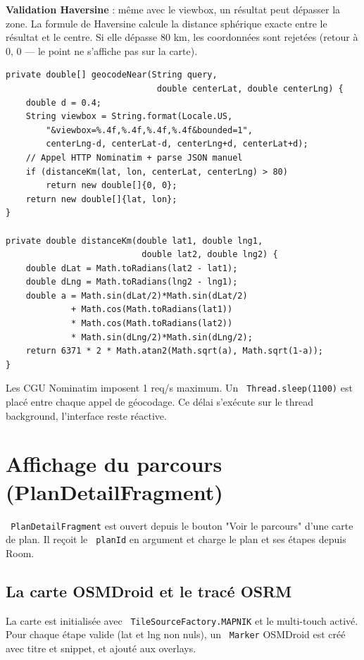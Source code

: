 \documentclass[a4paper,12pt,openany]{report}
\newenvironment{warnbox}[1][Attention]{%
  \begin{tcolorbox}[mybox, colback=warnbg, colframe=Goldenrod!60,
    title=\textcolor{brown!80}{#1}]\small\color{brown!70!black}}
  {\end{tcolorbox}}
\newcommand{\ic}[1]{\texttt{\small\colorbox{lightbg}{\color{navy!90} #1}}}
\begin{document}
\textbf{Validation Haversine} : même avec le viewbox, un résultat peut
dépasser la zone. La formule de Haversine calcule la distance sphérique exacte
entre le résultat et le centre. Si elle dépasse 80 km, les coordonnées sont
rejetées (retour à 0, 0 — le point ne s'affiche pas sur la carte).

\begin{lstlisting}
private double[] geocodeNear(String query,
                              double centerLat, double centerLng) {
    double d = 0.4;
    String viewbox = String.format(Locale.US,
        "&viewbox=%.4f,%.4f,%.4f,%.4f&bounded=1",
        centerLng-d, centerLat-d, centerLng+d, centerLat+d);
    // Appel HTTP Nominatim + parse JSON manuel
    if (distanceKm(lat, lon, centerLat, centerLng) > 80)
        return new double[]{0, 0};
    return new double[]{lat, lon};
}

private double distanceKm(double lat1, double lng1,
                           double lat2, double lng2) {
    double dLat = Math.toRadians(lat2 - lat1);
    double dLng = Math.toRadians(lng2 - lng1);
    double a = Math.sin(dLat/2)*Math.sin(dLat/2)
             + Math.cos(Math.toRadians(lat1))
             * Math.cos(Math.toRadians(lat2))
             * Math.sin(dLng/2)*Math.sin(dLng/2);
    return 6371 * 2 * Math.atan2(Math.sqrt(a), Math.sqrt(1-a));
}
\end{lstlisting}

\begin{warnbox}[Délai inter-appels Nominatim]
Les CGU Nominatim imposent 1 req/s maximum. Un \ic{Thread.sleep(1100)} est
placé entre chaque appel de géocodage. Ce délai s'exécute sur le thread
background, l'interface reste réactive.
\end{warnbox}

\section{Affichage du parcours (PlanDetailFragment)}

\ic{PlanDetailFragment} est ouvert depuis le bouton "Voir le parcours" d'une
carte de plan. Il reçoit le \ic{planId} en argument et charge le plan et ses
étapes depuis Room.

\subsection{La carte OSMDroid et le tracé OSRM}

La carte est initialisée avec \ic{TileSourceFactory.MAPNIK} et le
multi-touch activé. Pour chaque étape valide (lat et lng non nuls), un
\ic{Marker} OSMDroid est créé avec titre et snippet, et ajouté aux overlays.
\end{document}

